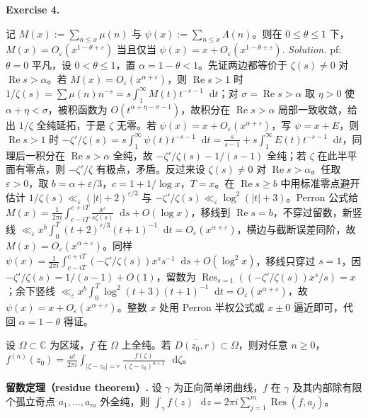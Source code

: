 \documentclass[
	colors = true,
	geometry = a4,
	fontsetup = font-setup-overleaf.tex,
	titlesetup = titles-setup.tex
]{AJbook}
\newenvironment{sheetexercise}[1]{%
	\par\addvspace{0.03\baselineskip}
	\begingroup\color{problemblue}%
	\noindent\textbf{Exercise #1.}\enspace
}{%
	\unskip\enspace
	\endgroup
}
\newenvironment{solution}{%
	\textit{Solution.}\enspace
}{%
	\par\addvspace{0.02\baselineskip}
}
\providecommand{\dd}{\mathop{}\!\mathrm d}
\begin{document}
\begin{sheetexercise}{4}
记 $M(x):=\sum_{n\leq x}\mu(n)$ 与 $\psi(x):=\sum_{n\leq x}\Lambda(n)$。则在 $0\leq\theta\leq1$ 下，$M(x)=O_\varepsilon(x^{1-\theta+\varepsilon})$ 当且仅当 $\psi(x)=x+O_\varepsilon(x^{1-\theta+\varepsilon})$.
\end{sheetexercise}
\begin{solution}pf: $\theta=0$ 平凡，设 $0<\theta\leq1$，置 $\alpha=1-\theta<1$。先证两边都等价于 $\zeta(s)\neq0$ 对 $\operatorname{Re}s>\alpha$。若 $M(x)=O_\varepsilon(x^{\alpha+\varepsilon})$，则 $\operatorname{Re}s>1$ 时 $1/\zeta(s)=\sum\mu(n)n^{-s}=s\int_1^\infty M(t)t^{-s-1}\dd t$；对 $\sigma=\operatorname{Re}s>\alpha$ 取 $\eta>0$ 使 $\alpha+\eta<\sigma$，被积函数为 $O(t^{\alpha+\eta-\sigma-1})$，故积分在 $\operatorname{Re}s>\alpha$ 局部一致收敛，给出 $1/\zeta$ 全纯延拓，于是 $\zeta$ 无零。若 $\psi(x)=x+O_\varepsilon(x^{\alpha+\varepsilon})$，写 $\psi=x+E$，则 $\operatorname{Re}s>1$ 时 $-\zeta'/\zeta(s)=s\int_1^\infty\psi(t)t^{-s-1}\dd t=\frac{s}{s-1}+s\int_1^\infty E(t)t^{-s-1}\dd t$，同理后一积分在 $\operatorname{Re}s>\alpha$ 全纯，故 $-\zeta'/\zeta(s)-1/(s-1)$ 全纯；若 $\zeta$ 在此半平面有零点，则 $-\zeta'/\zeta$ 有极点，矛盾。反过来设 $\zeta(s)\neq0$ 对 $\operatorname{Re}s>\alpha$。任取 $\varepsilon>0$，取 $b=\alpha+\varepsilon/3$，$c=1+1/\log x$，$T=x$。在 $\operatorname{Re}s\geq b$ 中用标准零点避开估计 $1/\zeta(s)\ll_\varepsilon(|t|+2)^{\varepsilon/3}$ 与 $-\zeta'/\zeta(s)\ll_\varepsilon\log^2(|t|+3)$。Perron 公式给 $M(x)=\frac1{2\pi i}\int_{c-iT}^{c+iT}\frac{x^s}{s\zeta(s)}\dd s+O(\log x)$，移线到 $\operatorname{Re}s=b$，不穿过留数，新竖线 $\ll_\varepsilon x^b\int_0^T(t+2)^{\varepsilon/3}(t+1)^{-1}\dd t=O_\varepsilon(x^{\alpha+\varepsilon})$，横边与截断误差同阶，故 $M(x)=O_\varepsilon(x^{\alpha+\varepsilon})$。同样 $\psi(x)=\frac1{2\pi i}\int_{c-iT}^{c+iT}(-\zeta'/\zeta(s))x^s s^{-1}\dd s+O(\log^2x)$，移线只穿过 $s=1$，因 $-\zeta'/\zeta(s)=1/(s-1)+O(1)$，留数为 $\operatorname{Res}_{s=1}((-\zeta'/\zeta(s))x^s/s)=x$；余下竖线 $\ll_\varepsilon x^b\int_0^T\log^2(t+3)(t+1)^{-1}\dd t=O_\varepsilon(x^{\alpha+\varepsilon})$，故 $\psi(x)=x+O_\varepsilon(x^{\alpha+\varepsilon})$。整数 $x$ 处用 Perron 半权公式或 $x\pm0$ 逼近即可，代回 $\alpha=1-\theta$ 得证。\end{solution}

\endgroup

\enlargethispage{2\baselineskip}

\begin{proposition}
设 $\Omega\subset\mathbb C$ 为区域，$f$ 在 $\Omega$ 上全纯。若 $\overline{D(z_0,r)}\subset\Omega$，则对任意 $n\geq0$，$f^{(n)}(z_0)=\frac{n!}{2\pi i}\int_{|\zeta-z_0|=r}\frac{f(\zeta)}{(\zeta-z_0)^{n+1}}\,\dd\zeta$。
\end{proposition}

\noindent\textbf{留数定理（residue theorem）.} 设 $\gamma$ 为正向简单闭曲线，$f$ 在 $\gamma$ 及其内部除有限个孤立奇点 $a_1,\ldots,a_m$ 外全纯，则 $\int_\gamma f(z)\,\dd z=2\pi i\sum_{j=1}^m \operatorname{Res}(f,a_j)$。
\end{document}

